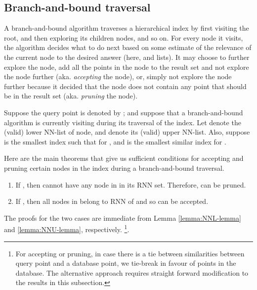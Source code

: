 \documentclass[prodmode,letterpaper]{acmsmall}
\newcommand{\rknn}{RNN\xspace}
\begin{document}
\subsection{Branch-and-bound traversal}
A branch-and-bound algorithm traverses a hierarchical index by first visiting
the root, and then exploring its children nodes, and so on. For every node it
visits, the algorithm decides what to do next based on some estimate of the
relevance of the current node to the desired answer (here,  and 
lists). It may choose to further explore the node, add all the points
in the node to the result set and not explore the node further (aka. {\em
accepting} the node), or, simply not explore the node further because it decided
that the node does not contain any point that should be in the result set (aka.
{\em pruning} the node).

Suppose the query point is denoted by ; and suppose that a branch-and-bound
algorithm is currently visiting  during its traversal of the
index. Let  denote the (valid) lower NN-list of 
node, and  denote its (valid) upper NN-list. Also, suppose  is the smallest
index such that  for , and 
 is the smallest similar index for .

Here are the main theorems that give us sufficient conditions for accepting and
pruning certain nodes in the index during a branch-and-bound traversal.

\begin{theorem}\label{thm:accept-prune-condition}
\begin{enumerate}
    \item If , then  cannot have any node in  in
its \rknn set. Therefore,  can be pruned.
    \item If , then all nodes in  belong to \rknn of 
and so  can be accepted.
\end{enumerate}
\end{theorem}
The proofs for the two cases are immediate from
Lemma \ref{lemma:NNL-lemma} and \ref{lemma:NNU-lemma}, respectively.
\footnote{For accepting or pruning, in case there is a tie between
similarities between query point and a database point, we tie-break in favour of points in the database. The alternative
approach requires straight forward modification to the results in this
subsection.}.
\end{document}

